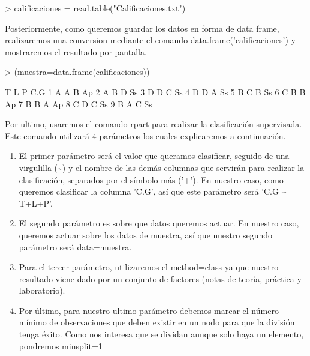 \documentclass[parskip=full]{scrartcl}
\begin{document}
\begin{Schunk}
\begin{Sinput}
> calificaciones = read.table("Calificaciones.txt")
\end{Sinput}
\end{Schunk}


Posteriormente, como queremos guardar los datos en forma de data frame, realizaremos una conversion mediante el comando data.frame('calificaciones') y mostraremos el resultado por pantalla.


\begin{Schunk}
\begin{Sinput}
> (muestra=data.frame(calificaciones))
\end{Sinput}
\begin{Soutput}
  T L P C.G
1 A A B  Ap
2 A B D  Ss
3 D D C  Ss
4 D D A  Ss
5 B C B  Ss
6 C B B  Ap
7 B B A  Ap
8 C D C  Ss
9 B A C  Ss
\end{Soutput}
\end{Schunk}


Por ultimo, usaremos el comando rpart para realizar la clasificación supervisada. Este comando utilizará 4 parámetros los cuales explicaremos a continuación.

\begin{enumerate}

\item
El primer parámetro será el valor que queramos clasificar, seguido de una virgulilla (\textasciitilde{}) y el nombre de las demás columnas que servirán para realizar la clasificación, separados por el símbolo más ('+'). En nuestro caso, como queremos clasificar la columna 'C.G', así que este parámetro será 'C.G \textasciitilde{} T+L+P'.

\item
El segundo parámetro es sobre que datos queremos actuar. En nuestro caso, queremos actuar sobre los datos de muestra, así que nuestro segundo parámetro será data=muestra.

\item
Para el tercer parámetro, utilizaremos el method=class ya que nuestro resultado viene dado por un conjunto de factores (notas de teoría, práctica y laboratorio).

\item
Por último, para nuestro ultimo parámetro debemos marcar el número mínimo de observaciones que deben existir en un nodo para que la división tenga éxito. Como nos interesa que se dividan aunque solo haya un elemento, pondremos minsplit=1

\end{enumerate}
\end{document}
